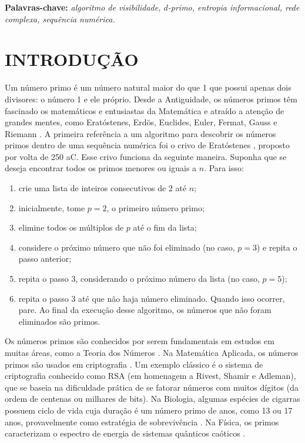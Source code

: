 \documentclass[12pt,a4paper,fleqn]{report}
\begin{document}
\noindent
{\bf Palavras-chave:} {\it algoritmo de visibilidade, $d$-primo, entropia informacional, rede complexa, sequência numérica.}


\newpage

\newpage
\thispagestyle{empty}
\tableofcontents
\listoffigures
\listoftables

\newpage
\pagestyle{plain}
\renewcommand{\baselinestretch}{1.5}
\normalsize


\chapter{INTRODUÇÃO}

Um número primo é um número natural maior do que 1 que possui apenas dois divisores: o número 1 e ele próprio. 
Desde a Antiguidade, os números primos têm fascinado os matemáticos e entusiastas
da Matemática \cite{a66,a44} e atraído a atenção de
grandes mentes, como  Eratóstenes, Erd\"os, Euclides, 
Euler, Fermat,  Gauss e Riemann \cite{a66,a44}. A primeira
referência a um algoritmo para descobrir os números primos dentro de uma sequência numérica foi o crivo de Eratóstenes \cite{nicomachus300}, proposto por volta de 250 aC. Esse crivo funciona da
seguinte maneira. Suponha que se deseja encontrar todos os primos menores
ou iguais a $n$. Para isso:

\begin{enumerate}
    \item crie uma lista de inteiros consecutivos de 2 até $n$;
    \item inicialmente, tome $p = 2$, o primeiro número primo;
    \item elimine todos os  múltiplos de $p$ até o fim da lista;
    \item considere o próximo número que não foi eliminado (no caso, $p=3$) e repita o passo anterior;
    \item repita o passo 3, considerando o próximo número da lista (no caso, $p=5$);
    \item repita o passo 3 até que não haja
    número eliminado. Quando isso ocorrer, pare. Ao final da execução desse algoritmo, os números que não foram eliminados são primos.
\end{enumerate}
    


Os números primos são conhecidos por serem fundamentais em estudos
em muitas áreas, como a Teoria dos Números \cite{a66,a44}.
Na Matemática Aplicada, os números primos são usados em criptografia
\cite{a65}. Um exemplo clássico  é o sistema de criptografia
conhecido como RSA (em homenagem a Rivest, Shamir e Adleman), que se baseia na dificuldade prática de se fatorar
números com muitos dígitos (da ordem de centenas ou milhares de bits). Na Biologia, algumas espécies de cigarras possuem ciclo de vida
cuja duração é um número primo de anos, como 13 ou 17 anos, provavelmente como estratégia de sobrevivência \cite{a48}. Na Física, os primos caracterizam o espectro de energia de sistemas 
quânticos caóticos \cite{a59}. 
\end{document}
